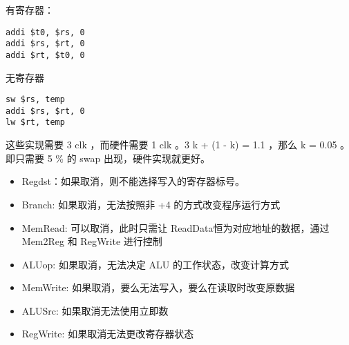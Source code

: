 \documentclass[lang=cn,11pt,a4paper,cite=authoryear,twocolumn]{elegantpaper}
\begin{document}
有寄存器：

\begin{lstlisting}
addi $t0, $rs, 0
addi $rs, $rt, 0
addi $rt, $t0, 0
\end{lstlisting}

无寄存器


\begin{lstlisting}
sw $rs, temp 
addi $rs, $rt, 0
lw $rt, temp
\end{lstlisting}

这些实现需要 3 clk ，而硬件需要 1 clk 。3 k + (1 - k) = 1.1 ，那么 k = 0.05 。即只需要 5 \% 的 swap 出现，硬件实现就更好。



\begin{itemize}
    \item Regdst：如果取消，则不能选择写入的寄存器标号。
    \item Branch: 如果取消，无法按照非 +4 的方式改变程序运行方式
    \item MemRead: 可以取消，此时只需让 ReadData恒为对应地址的数据，通过Mem2Reg 和 RegWrite 进行控制
    \item ALUop: 如果取消，无法决定 ALU 的工作状态，改变计算方式
    \item MemWrite: 如果取消，要么无法写入，要么在读取时改变原数据
    \item ALUSrc: 如果取消无法使用立即数
    \item RegWrite: 如果取消无法更改寄存器状态
\end{itemize}


\end{document}
